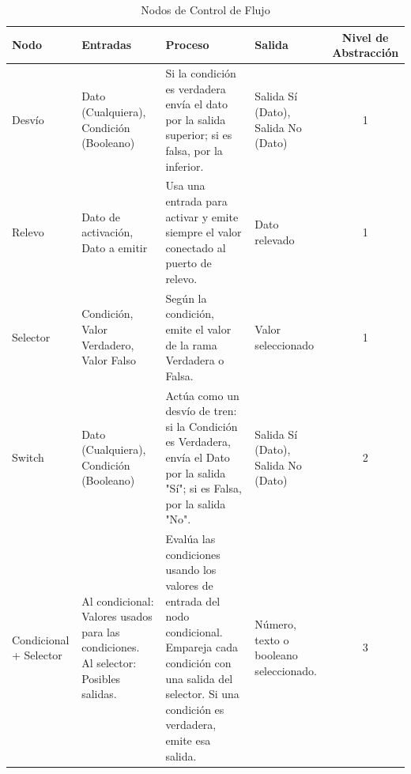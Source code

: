 \begin{table}[H]
    \centering
    \caption{Nodos de Control de Flujo}
    \begin{tabularx}{\textwidth}{ l X X X c }
        \hline
        \textbf{Nodo}          & \textbf{Entradas}                                                                            & \textbf{Proceso}                                                                                                                                                                 & \textbf{Salida}                        & \textbf{Nivel de Abstracción} \\ \hline
        Desvío                 & Dato (Cualquiera), Condición (Booleano)                                                      & Si la condición es verdadera envía el dato por la salida superior; si es falsa, por la inferior.                                                                                 & Salida Sí (Dato), Salida No (Dato)     & 1                             \\
        Relevo                 & Dato de activación, Dato a emitir                                                            & Usa una entrada para activar y emite siempre el valor conectado al puerto de relevo.                                                                                             & Dato relevado                          & 1                             \\
        Selector               & Condición, Valor Verdadero, Valor Falso                                                      & Según la condición, emite el valor de la rama Verdadera o Falsa.                                                                                                                 & Valor seleccionado                     & 1                             \\
        Switch                 & Dato (Cualquiera), Condición (Booleano)                                                      & Actúa como un desvío de tren: si la Condición es Verdadera, envía el Dato por la salida "Sí"; si es Falsa, por la salida "No".                                                   & Salida Sí (Dato), Salida No (Dato)     & 2                             \\
        Condicional + Selector & Al condicional: Valores usados para las condiciones. \newline Al selector: Posibles salidas. & Evalúa las condiciones usando los valores de entrada del nodo condicional. Empareja cada condición con una salida del selector. Si una condición es verdadera, emite esa salida. & Número, texto o booleano seleccionado. & 3                             \\
        \hline
    \end{tabularx}
\end{table}


